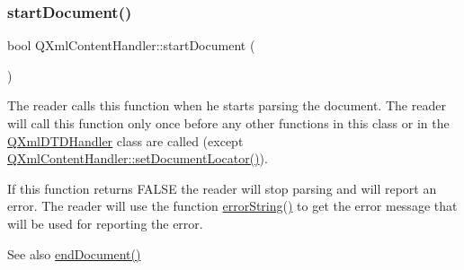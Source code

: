 \subsubsection{\texorpdfstring{startDocument()}{startDocument()}}
{\footnotesize\ttfamily bool Q\+Xml\+Content\+Handler\+::start\+Document (\begin{DoxyParamCaption}{ }\end{DoxyParamCaption})\hspace{0.3cm}{\ttfamily [pure virtual]}}

The reader calls this function when he starts parsing the document. The reader will call this function only once before any other functions in this class or in the \mbox{\hyperlink{class_q_xml_d_t_d_handler}{Q\+Xml\+D\+T\+D\+Handler}} class are called (except \mbox{\hyperlink{class_q_xml_content_handler_a89863bd9a6372d3d73086aa99107bca7}{Q\+Xml\+Content\+Handler\+::set\+Document\+Locator()}}).

If this function returns F\+A\+L\+SE the reader will stop parsing and will report an error. The reader will use the function \mbox{\hyperlink{class_q_xml_content_handler_adba96547bad1cf1b009dbfb7b7c571be}{error\+String()}} to get the error message that will be used for reporting the error.

\begin{DoxySeeAlso}{See also}
\mbox{\hyperlink{class_q_xml_content_handler_a534bd1e4627e65340eb17d90d1ab1c12}{end\+Document()}} 
\end{DoxySeeAlso}



